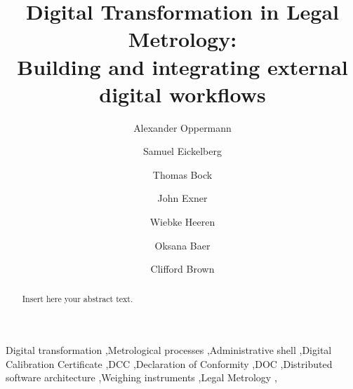 \documentclass[3p,times,procedia]{elsarticle}
\begin{document}
\begin{frontmatter}




\title{Digital Transformation in Legal Metrology: \\ Building and integrating external digital workflows}




\author[a]{Alexander Oppermann} 
\author[a]{Samuel Eickelberg}
\author[a]{Thomas Bock}
\author[a]{John Exner}
\author[b]{Wiebke Heeren}
\author[b]{Oksana Baer}
\author[b]{Clifford Brown}

\address[a]{Physikalisch-Technische Bundesanstalt (PTB), Abbestr. 2-12, 10587 Berlin, Germany}
\address[b]{Physikalisch-Technische Bundesanstalt (PTB), Bundesallee 100, 38116 Braunschweig, Germany}

\begin{abstract}
Insert here your abstract text.
\end{abstract}

\begin{keyword}
Digital transformation \sep Metrological processes \sep Administrative shell \sep Digital Calibration Certificate \sep DCC \sep Declaration of Conformity \sep DOC \sep Distributed software architecture  \sep Weighing instruments \sep Legal Metrology \sep 




\end{keyword}
\end{frontmatter}
\end{document}
